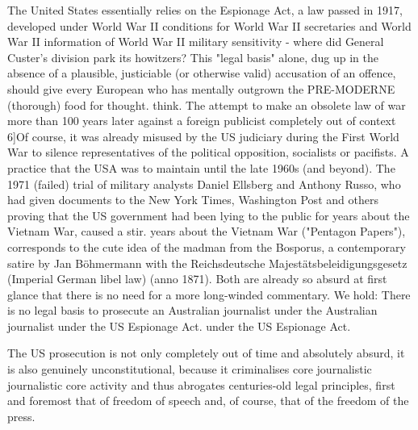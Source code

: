 \begin{multicols}{2}
The United States essentially relies on the Espionage Act, a law passed in
1917, developed under World War II conditions for World War II secretaries and World War II information of World War II military sensitivity - where
did General Custer's division park its howitzers?
This "legal basis" alone, dug up in the absence of a plausible, justiciable (or otherwise valid) accusation of an offence, should give every European who has mentally outgrown the PRE-MODERNE (thorough) food for thought.
think. The attempt to make an obsolete law of war
more than 100 years later against a foreign publicist completely out of context 
6]{Of course, it was already misused by the US judiciary during the First World War to silence representatives of the political opposition, socialists or pacifists. 
A practice that the USA was to maintain until the late 1960s (and beyond). The 1971 (failed) trial of military analysts Daniel Ellsberg and Anthony Russo, who had given documents to the New York Times, Washington Post and others proving that the US government had been lying to the public for years about the Vietnam War, caused a stir.
years about the Vietnam War ("Pentagon Papers")}, corresponds to the cute idea of the madman from the Bosporus, a contemporary satire by Jan Böhmermann
with the Reichsdeutsche Majestätsbeleidigungsgesetz (Imperial German libel law)
(anno 1871). Both are already
so absurd at first glance that there is no need for a more long-winded commentary. We hold:
There is no legal basis to prosecute an Australian journalist under the
Australian journalist under the US Espionage Act.
under the US Espionage Act.

The US prosecution is not only completely out of time
and absolutely absurd, it is also genuinely unconstitutional, because it criminalises core journalistic 
journalistic core activity and thus abrogates centuries-old legal principles, first and foremost that of freedom of speech and, of course, that of the
freedom of the press.




\end{multicols}
